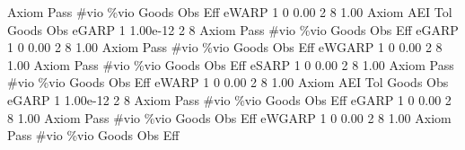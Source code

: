 {\smallskip}
{\smallskip}
       Axiom {\VBAR} Pass        \#vio        \%vio       Goods         Obs         Eff  
       eWARP {\VBAR}    1           0        0.00           2           8        1.00  
{\smallskip}
       Axiom {\VBAR}       AEI        Tol      Goods        Obs 
       eGARP {\VBAR}         1   1.00e-12          2          8 
{\smallskip}
{\smallskip}
{\smallskip}
       Axiom {\VBAR} Pass        \#vio        \%vio       Goods         Obs         Eff  
       eGARP {\VBAR}    1           0        0.00           2           8        1.00  
{\smallskip}
{\smallskip}
{\smallskip}
       Axiom {\VBAR} Pass        \#vio        \%vio       Goods         Obs         Eff  
      eWGARP {\VBAR}    1           0        0.00           2           8        1.00  
{\smallskip}
{\smallskip}
{\smallskip}
       Axiom {\VBAR} Pass        \#vio        \%vio       Goods         Obs         Eff  
       eSARP {\VBAR}    1           0        0.00           2           8        1.00  
{\smallskip}
{\smallskip}
{\smallskip}
       Axiom {\VBAR} Pass        \#vio        \%vio       Goods         Obs         Eff  
       eWARP {\VBAR}    1           0        0.00           2           8        1.00  
{\smallskip}
       Axiom {\VBAR}       AEI        Tol      Goods        Obs 
       eGARP {\VBAR}         1   1.00e-12          2          8 
{\smallskip}
{\smallskip}
{\smallskip}
       Axiom {\VBAR} Pass        \#vio        \%vio       Goods         Obs         Eff  
       eGARP {\VBAR}    1           0        0.00           2           8        1.00  
{\smallskip}
{\smallskip}
{\smallskip}
       Axiom {\VBAR} Pass        \#vio        \%vio       Goods         Obs         Eff  
      eWGARP {\VBAR}    1           0        0.00           2           8        1.00  
{\smallskip}
{\smallskip}
{\smallskip}
       Axiom {\VBAR} Pass        \#vio        \%vio       Goods         Obs         Eff  
